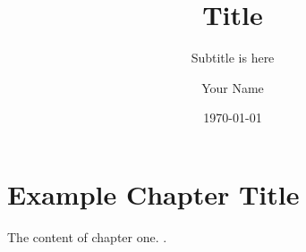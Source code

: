 \documentclass[lang=cn,11pt]{elegantbook}
\title{Title}
\subtitle{Subtitle is here}
\author{Your Name}
\institute{XXX University}
\date{\today}
\begin{document}
\maketitle
\tableofcontents
\mainmatter
\hypersetup{pageanchor=true}
\chapter{Example Chapter Title}

The content of chapter one. \cite{cn1}.

\printbibliography 
\end{document}
